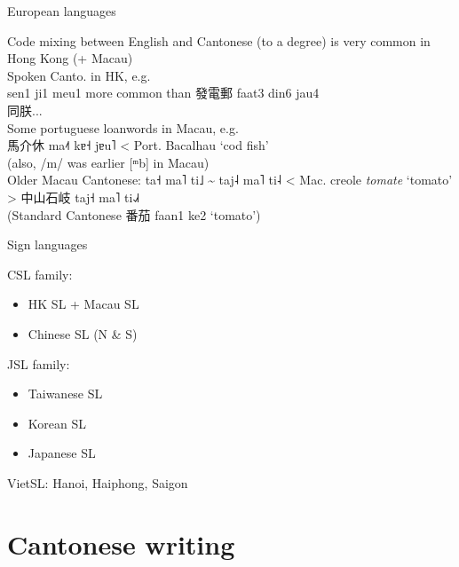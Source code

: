\documentclass{beamer}
\begin{document}
\begin{frame}[fragile]{European languages}

Code mixing between English and Cantonese (to a degree) is very common in Hong Kong (+ Macau)\\
\smallskip
Spoken Canto. in HK, e.g.\\ 
sen1 ji1 meu1 more common than 發電郵 faat3 din6 jau4\\
\smallskip
同朕...\\
\bigskip
Some portuguese loanwords in Macau, e.g.\\
馬介休 ma˨˦ kɐ˧ jɐu˥ < Port. Bacalhau \enquote*{cod fish}\\
(also, /m/ was earlier [ᵐb] in Macau)\\
\smallskip
Older Macau Cantonese: ta˧ ma˥ ti˩ \~{} taj˨ ma˥ ti˨ < Mac. creole \textit{tomate} \enquote*{tomato}\\
> 中山石岐 taj˧ ma˥ ti˨˩˧\\
(Standard Cantonese 番茄 faan1 ke2 \enquote*{tomato})\\

\end{frame}

\begin{frame}[fragile]{Sign languages}

CSL family:\\
\begin{itemize}
    \item HK SL + Macau SL\\
    \item Chinese SL (N \& S)\\
\end{itemize}

JSL family:\\
\begin{itemize}
    \item Taiwanese SL\\
    \item Korean SL\\
    \item Japanese SL\\
\end{itemize}

VietSL: Hanoi, Haiphong, Saigon\\

\end{frame}

\section{Cantonese writing}
\end{document}
